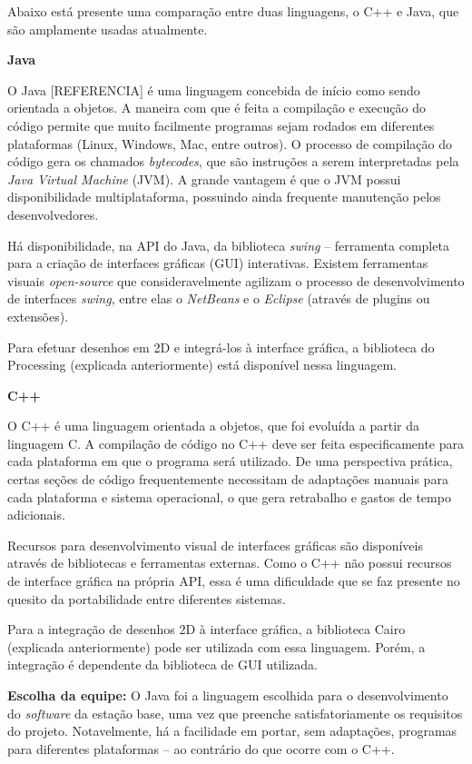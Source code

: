 Abaixo está presente uma comparação entre duas linguagens, o C++ e Java, que são amplamente usadas atualmente.

\textbf{Java}

O Java [REFERENCIA] é uma linguagem concebida de início como sendo orientada a objetos. A maneira com que é feita a compilação e execução do código permite que muito facilmente programas sejam rodados em diferentes plataformas (Linux, Windows, Mac, entre outros). O processo de compilação do código gera os chamados \textit{bytecodes}, que são instruções a serem interpretadas pela \textit{Java Virtual Machine} (JVM). A grande vantagem é que o JVM possui disponibilidade multiplataforma, possuindo ainda frequente manutenção pelos desenvolvedores.

Há disponibilidade, na API do Java, da biblioteca \textit{swing} -- ferramenta completa para a criação de interfaces gráficas (GUI) interativas. Existem ferramentas visuais \textit{open-source} que consideravelmente agilizam o processo de desenvolvimento de interfaces \textit{swing}, entre elas o \textit{NetBeans} e o \textit{Eclipse} (através de plugins ou extensões). 

Para efetuar desenhos em 2D e integrá-los à interface gráfica, a biblioteca do Processing (explicada anteriormente) está disponível nessa linguagem.


\textbf{C++}

O C++ é uma linguagem orientada a objetos, que foi evoluída a partir da linguagem C. A compilação de código no C++ deve ser feita especificamente para cada plataforma em que o programa será utilizado. De uma perspectiva prática, certas seções de código frequentemente necessitam de adaptações manuais para cada plataforma e sistema operacional, o que gera retrabalho e gastos de tempo adicionais. 

Recursos para desenvolvimento visual de interfaces gráficas são disponíveis através de bibliotecas e ferramentas externas. Como o C++ não possui recursos de interface gráfica na própria API, essa é uma dificuldade que se faz presente no quesito da portabilidade entre diferentes sistemas. 

Para a integração de desenhos 2D à interface gráfica, a biblioteca Cairo (explicada anteriormente) pode ser utilizada com essa linguagem. Porém, a integração é dependente da biblioteca de GUI utilizada.


\textbf{Escolha da equipe:} O Java foi a linguagem escolhida para o desenvolvimento do \textit{software} da estação base, uma vez que preenche satisfatoriamente os requisitos do projeto. Notavelmente, há a facilidade em portar, sem adaptações, programas para diferentes plataformas -- ao contrário do que ocorre com o C++.

